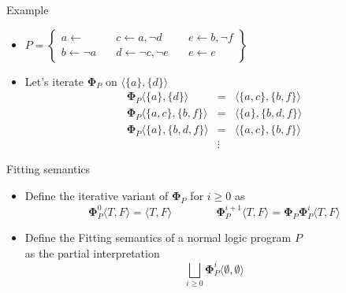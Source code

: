 \begin{frame}{Example}
  \bigskip
  \begin{itemize}
  \item<1->
    \(
    P
    =
    \left\{
      \begin{array}{lll}
        a \leftarrow                \quad &
        c \leftarrow a, \neg d      \quad &
        e \leftarrow b, \neg f
        \\
        b \leftarrow \neg a         \quad &
        d \leftarrow \neg c, \neg e \quad &
        e \leftarrow e
      \end{array}
    \right\}
    \)
    \bigskip
  \item<2-> Let's iterate ${\mathbf{\Phi}}_{P}$ on $\langle \{a\}, \{d\}\rangle$
    \[
    \begin{array}{rcl}
    {\mathbf{\Phi}}_{P}\langle\{a\}  ,\{d\}    \rangle &=&\langle\{a, c\} ,\{b,f\}  \rangle
    \\
    {\mathbf{\Phi}}_{P}\langle\{a,c\},\{b,f\}  \rangle &=&\langle\{a\}    ,\{b,d,f\}\rangle
    \\
    {\mathbf{\Phi}}_{P}\langle\{a\}  ,\{b,d,f\}\rangle &=&\langle\{a,c\}  ,\{b,f\}  \rangle
    \\
    & \vdots &
    \end{array}
    \]
  \end{itemize}
\end{frame}
\begin{frame}{Fitting semantics}
  \bigskip
  \begin{itemize}
  \item<1-> Define the iterative variant of ${\mathbf{\Phi}}_P$ for $i\geq 0$ as
    \[
      {\mathbf{\Phi}}_P^0\langle T, F \rangle = \langle T, F \rangle
      \qquad\qquad
      {\mathbf{\Phi}}_P^{i+1}\langle T, F \rangle =
      {\mathbf{\Phi}}_P{\mathbf{\Phi}}_P^i\langle T, F \rangle
    \]
  \item<2-> Define the \alert{Fitting semantics} of a normal logic program $P$\\
    as the partial interpretation
    \[
      \textstyle{\bigsqcup_{i \geq 0}} {\mathbf{\Phi}}_P^i \langle \emptyset, \emptyset \rangle
    \]
  \end{itemize}
\nocite{fitting85a}
\end{frame}
